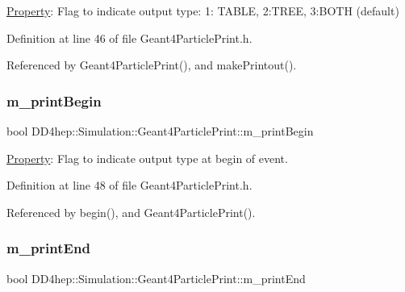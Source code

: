 \hyperlink{class_d_d4hep_1_1_property}{Property}\+: Flag to indicate output type\+: 1\+: T\+A\+B\+LE, 2\+:T\+R\+EE, 3\+:B\+O\+TH (default) 



Definition at line 46 of file Geant4\+Particle\+Print.\+h.



Referenced by Geant4\+Particle\+Print(), and make\+Printout().

\hypertarget{class_d_d4hep_1_1_simulation_1_1_geant4_particle_print_a876b6bca1f7dc285d064785ddf9838a2}{}\label{class_d_d4hep_1_1_simulation_1_1_geant4_particle_print_a876b6bca1f7dc285d064785ddf9838a2} 
\subsubsection{\texorpdfstring{m\+\_\+print\+Begin}{m\_printBegin}}
{\footnotesize\ttfamily bool D\+D4hep\+::\+Simulation\+::\+Geant4\+Particle\+Print\+::m\+\_\+print\+Begin\hspace{0.3cm}{\ttfamily [protected]}}



\hyperlink{class_d_d4hep_1_1_property}{Property}\+: Flag to indicate output type at begin of event. 



Definition at line 48 of file Geant4\+Particle\+Print.\+h.



Referenced by begin(), and Geant4\+Particle\+Print().

\hypertarget{class_d_d4hep_1_1_simulation_1_1_geant4_particle_print_a1c439ecc16654cace16881a0c6a1414c}{}\label{class_d_d4hep_1_1_simulation_1_1_geant4_particle_print_a1c439ecc16654cace16881a0c6a1414c} 
\subsubsection{\texorpdfstring{m\+\_\+print\+End}{m\_printEnd}}
{\footnotesize\ttfamily bool D\+D4hep\+::\+Simulation\+::\+Geant4\+Particle\+Print\+::m\+\_\+print\+End\hspace{0.3cm}{\ttfamily [protected]}}



